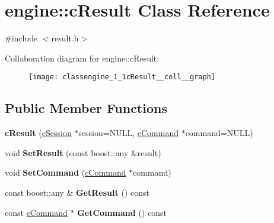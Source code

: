 \hypertarget{classengine_1_1cResult}{\section{engine\-:\-:c\-Result \-Class \-Reference}
\label{classengine_1_1cResult}
}


{\ttfamily \#include $<$result.\-h$>$}



\-Collaboration diagram for engine\-:\-:c\-Result\-:
\nopagebreak
\begin{figure}[H]
\begin{center}
\leavevmode
\texttt{[image: classengine\_1\_1cResult\_\_coll\_\_graph]}
\end{center}
\end{figure}
\subsection*{\-Public \-Member \-Functions}
\begin{DoxyCompactItemize}
\item 
\hypertarget{classengine_1_1cResult_a31310dd255e30fdaeb34aa0e82c489f3}{{\bfseries c\-Result} (\hyperlink{classengine_1_1cSession}{c\-Session} $\ast$session=\-N\-U\-L\-L, \hyperlink{classengine_1_1cCommand}{c\-Command} $\ast$command=\-N\-U\-L\-L)}\label{classengine_1_1cResult_a31310dd255e30fdaeb34aa0e82c489f3}

\item 
\hypertarget{classengine_1_1cResult_ad72c10e84728768e45adbe9a653e4295}{void {\bfseries \-Set\-Result} (const boost\-::any \&result)}\label{classengine_1_1cResult_ad72c10e84728768e45adbe9a653e4295}

\item 
\hypertarget{classengine_1_1cResult_ae9d0c2817585874e55a9ba8483e9d0b7}{void {\bfseries \-Set\-Command} (\hyperlink{classengine_1_1cCommand}{c\-Command} $\ast$command)}\label{classengine_1_1cResult_ae9d0c2817585874e55a9ba8483e9d0b7}

\item 
\hypertarget{classengine_1_1cResult_ab1b5a9a971a31c6bfe9c1deeab868476}{const boost\-::any \& {\bfseries \-Get\-Result} () const }\label{classengine_1_1cResult_ab1b5a9a971a31c6bfe9c1deeab868476}

\item 
\hypertarget{classengine_1_1cResult_aa414e0f8b867fa54c6e836f0a67517b0}{const \hyperlink{classengine_1_1cCommand}{c\-Command} $\ast$ {\bfseries \-Get\-Command} () const }\label{classengine_1_1cResult_aa414e0f8b867fa54c6e836f0a67517b0}

\end{DoxyCompactItemize}
